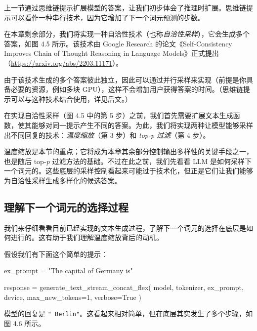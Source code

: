上一节通过思维链提示扩展模型的答案，让我们初步体会了推理时扩展。思维链提示可以看作一种串行技术，因为它增加了下一个词元预测的步数。

在本章剩余部分，我们将实现一种自洽性技术（也称\emph{自洽性采样}），它会生成多个答案，如图 4.5 所示。该技术由 Google Research 的论文《Self-Consistency Improves Chain of Thought Reasoning in Language Models》正式提出（\href{https://arxiv.org/abs/2203.11171}{https://arxiv.org/abs/2203.11171}）。


由于该技术生成的多个答案彼此独立，因此可以通过并行采样来实现（前提是你具备必要的资源，例如多块 GPU），这样不会增加用户获得答案的时间。（思维链提示可以与这种技术结合使用，详见后文。）

在实现自洽性采样（图 4.5 中的第 5 步）之前，我们首先需要扩展文本生成函数，使其能够对同一提示产生不同的答案。为此，我们将实现两种让模型能够采样出不同回复的技术：\emph{温度缩放}（第 3 步）和 \emph{top-p 过滤}（第 4 步）。

温度缩放是本节的重点；它将成为本章其余部分控制输出多样性的关键手段之一，也是随后 top-\emph{p} 过滤方法的基础。不过在此之前，我们先看看 LLM 是如何采样下一个词元的。这些底层的采样控制看起来可能过于技术化，但正是它们让我们能够为自洽性采样生成多样化的候选答案。

\subsection{理解下一个词元的选择过程}

我们来仔细看看目前已经实现的文本生成过程，了解下一个词元的选择在底层是如何进行的。这有助于我们理解温度缩放背后的动机。

假设我们有下面这个简单的提示：

\begin{codebox}
ex_prompt = "The capital of Germany is"

response = generate_text_stream_concat_flex(
    model, tokenizer, ex_prompt, device,
    max_new_tokens=1, verbose=True
)
\end{codebox}

模型的回复是 \texttt{"}\texttt{ Berlin}\texttt{"}。这看起来相对简单，但在底层其实发生了多个步骤，如图 4.6 所示。


